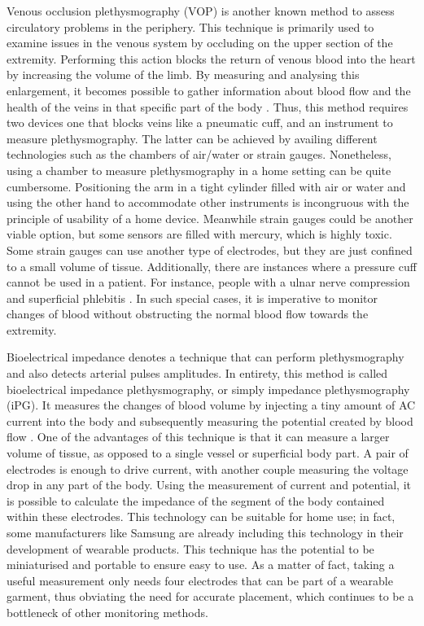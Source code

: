 Venous occlusion plethysmography (VOP) is another known method to assess circulatory problems in the periphery. This technique is primarily used to examine issues in the venous system by occluding on the upper section of the extremity. Performing this action blocks the return of venous blood into the heart by increasing the volume of the limb. By measuring and analysing this enlargement, it becomes possible to gather information about blood flow and the health of the veins in that specific part of the body \cite{wilkinson2001venous}. Thus, this method requires two devices one that blocks veins like a pneumatic cuff, and an instrument to measure plethysmography. The latter can be achieved by availing different technologies such as the chambers of air/water or strain gauges. Nonetheless, using a chamber to measure plethysmography in a home setting can be quite cumbersome. Positioning the arm in a tight cylinder filled with air or water and using the other hand to accommodate other instruments is incongruous with the principle of usability of a home device. Meanwhile strain gauges could be another viable option, but some sensors are filled with mercury, which is highly toxic. Some strain gauges can use another type of electrodes, but they are just confined to a small volume of tissue. Additionally, there are instances where a pressure cuff cannot be used in a patient. For instance, people with a ulnar nerve compression \cite{sy1981ulnar} and superficial phlebitis \cite{creevy1985phlebitis}. In such special cases, it is imperative to monitor changes of blood without obstructing the normal blood flow towards the extremity. 

Bioelectrical impedance denotes a technique that can perform plethysmography and also detects arterial pulses amplitudes. In entirety, this method is called bioelectrical impedance plethysmography, or simply impedance plethysmography (iPG). It measures the changes of blood volume by injecting a tiny amount of AC current into the body and subsequently measuring the potential created by blood flow \cite{bera2014bioelectrical}. One of the advantages of this technique is that it can measure a larger volume of tissue, as opposed to  a single vessel or superficial body part. A pair of electrodes is enough to drive current, with another couple measuring the voltage drop in any part of the body. Using the measurement of current and potential, it is possible to calculate the impedance of the segment of the body contained within these electrodes. This technology can be suitable for home use; in fact, some manufacturers like Samsung \cite{simsense} are already including this technology in their development of wearable products. This technique has the potential to be miniaturised and portable to ensure easy to use. As a matter of fact, taking a useful measurement only needs four electrodes that can be part of a wearable garment, thus obviating the need for accurate placement, which continues to be a bottleneck of other monitoring methods.

